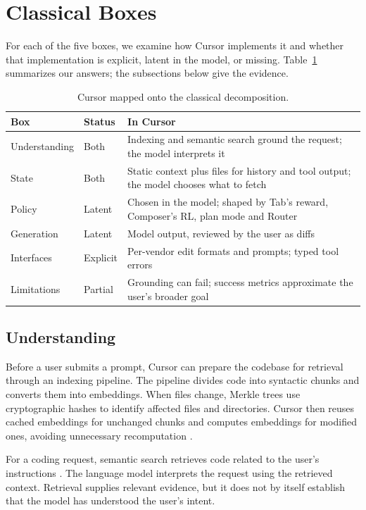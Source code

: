 \documentclass[11pt]{article}
\begin{document}
\section{Classical Boxes}

For each of the five boxes, we examine how Cursor implements it and whether that implementation is explicit, latent in the model, or missing. Table~\ref{tab:map} summarizes our answers; the subsections below give the evidence.

\begin{table}[t]
  \centering
  \small
  \begin{tabular}{@{}l l >{\raggedright\arraybackslash}p{}@{}}
    \hline
    \textbf{Box} & \textbf{Status} & \textbf{In Cursor} \\
    \hline
    Understanding & Both & Indexing and semantic search ground the request; the model interprets it \\
    State & Both & Static context plus files for history and tool output; the model chooses what to fetch \\
    Policy & Latent & Chosen in the model; shaped by Tab's reward, Composer's RL, plan mode and Router \\
    Generation & Latent & Model output, reviewed by the user as diffs \\
    Interfaces & Explicit & Per-vendor edit formats and prompts; typed tool errors \\
    Limitations & Partial & Grounding can fail; success metrics approximate the user's broader goal \\
    \hline
  \end{tabular}
  \caption{Cursor mapped onto the classical decomposition.}
  \label{tab:map}
\end{table}

\subsection{Understanding}

Before a user submits a prompt, Cursor can prepare the codebase for retrieval through an indexing pipeline. The pipeline divides code into syntactic chunks and converts them into embeddings. When files change, Merkle trees use cryptographic hashes to identify affected files and directories. Cursor then reuses cached embeddings for unchanged chunks and computes embeddings for modified ones, avoiding unnecessary recomputation \citep{cursor2026indexing}.

For a coding request, semantic search retrieves code related to the user's instructions \citep{cursor2025semantic}. The language model interprets the request using the retrieved context. Retrieval supplies relevant evidence, but it does not by itself establish that the model has understood the user's intent.
\end{document}
